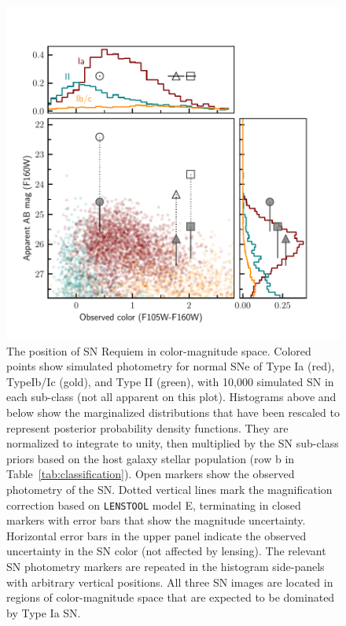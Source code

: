 \documentclass[12pt,dvipsnames]{article}
\def\SNABC{SN Requiem\xspace}
\def\lenstool{{\tt LENSTOOL}\xspace}
\begin{document}
\begin{figure}
    \centering
    \includegraphics{Paper/Figures/colormag_classification_supplement.pdf}
    \caption{The position of \SNABC in color-magnitude space.
    Colored points show simulated photometry for normal SNe of Type Ia (red), TypeIb/Ic (gold), and Type II (green), with 10,000 simulated SN in each sub-class (not all apparent on this plot).  Histograms above and below show the marginalized distributions that have been rescaled to represent posterior probability density functions. They are normalized to integrate to unity, then multiplied by the SN sub-class priors based on the host galaxy stellar population (row b in Table~\ref{tab:classification}).  Open markers show the observed photometry of the SN. Dotted vertical lines mark the magnification correction based on \lenstool model E, terminating in closed markers with error bars that show the magnitude uncertainty.  Horizontal error bars in the upper panel indicate the observed uncertainty in 
    the SN color (not affected by lensing).  The relevant SN photometry markers are repeated in the histogram side-panels with arbitrary vertical positions.  All three SN images are located in regions of color-magnitude space that are expected to be dominated by Type Ia SN.}
    \label{fig:colormag_classification_supplement}
\end{figure}
\end{document}
